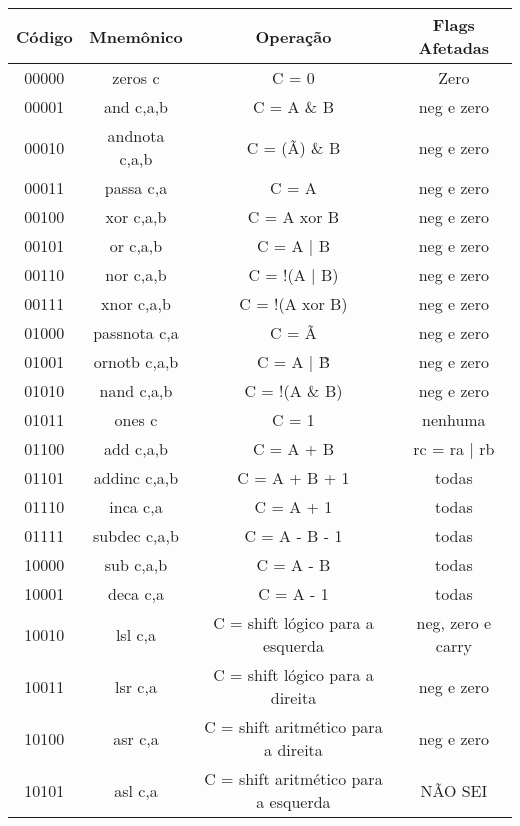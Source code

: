 \documentclass{article}
\begin{document}
  \begin{table}[H]
      \begin{center}
        \begin{tabular}[pos]{|c|c|c|c|} 
          \hline
          \cellcolor[gray]{0.9} \textbf{Código} & \cellcolor[gray]{0.9} \textbf{Mnemônico} & \cellcolor[gray]{0.9}\textbf{Operação} & \cellcolor[gray]{0.9}\textbf{Flags Afetadas} \\ \hline
          00000 & zeros c   &   C = 0   &   Zero \\ \hline
          00001 & and c,a,b   &   C = A \& B   &   neg e zero \\ \hline
          00010 & andnota c,a,b & C = (\~A) \& B & neg e zero\\ \hline
          00011 & passa c,a & C = A  &  neg e zero\\ \hline
          00100 & xor c,a,b & C = A xor B & neg e zero\\ \hline
          00101 & or c,a,b & C = A | B & neg e zero \\ \hline
          00110 & nor c,a,b & C = !(A | B) & neg e zero \\ \hline
          00111 & xnor c,a,b & C = !(A xor B) & neg e zero \\ \hline
          01000 & passnota c,a & C = \~A & neg e zero \\ \hline
          01001 & ornotb c,a,b & C = A | \~B & neg e zero \\ \hline
          01010 & nand c,a,b & C = !(A \& B) & neg e zero \\ \hline
          01011 & ones c & C = 1 & nenhuma \\ \hline
          01100 & add c,a,b & C = A + B & rc = ra | rb \\ \hline
          01101 & addinc c,a,b & C = A + B + 1 & todas \\ \hline
          01110 & inca c,a & C = A + 1 & todas\\ \hline
          01111 & subdec c,a,b & C = A - B - 1 & todas \\ \hline
          10000 & sub c,a,b & C = A - B &  todas\\ \hline
          10001 & deca c,a & C = A - 1 & todas \\ \hline
          10010 & lsl c,a & C = shift lógico para a esquerda & neg, zero e carry \\ \hline
          10011 & lsr c,a & C = shift lógico para a direita & neg e zero \\ \hline
          10100 & asr c,a & C = shift aritmético para a direita & neg e zero \\ \hline
          10101 & asl c,a & C = shift aritmético para a esquerda & NÃO SEI \\ \hline
        \end{tabular}
      \end{center}
    \end{table}
    
\end{document}
